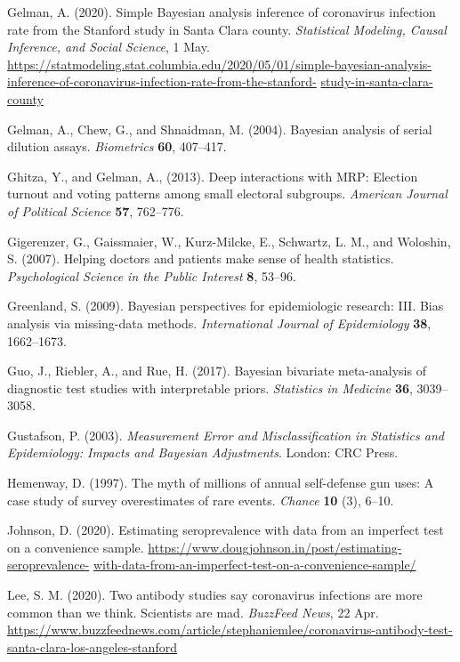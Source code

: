 \documentclass[11pt]{article}
\begin{document}
\bibitem Gelman, A. (2020).  Simple Bayesian analysis inference of
  coronavirus infection rate from the Stanford study in Santa Clara
  county. {\em Statistical Modeling, Causal Inference, and Social
    Science}, 1 May.  {\small \url{https://statmodeling.stat.columbia.edu/2020/05/01/simple-bayesian-analysis-inference-of-coronavirus-infection-rate-from-the-stanford-}} {\small \url{study-in-santa-clara-county}}
  
\bibitem Gelman, A., Chew, G., and Shnaidman, M. (2004).  Bayesian
  analysis of serial dilution assays. {\em Biometrics} {\bf 60},
  407--417.

\bibitem Ghitza, Y., and Gelman, A., (2013). Deep interactions with
  MRP: Election turnout and voting patterns among small electoral
  subgroups. {\em American Journal of Political Science} {\bf 57},
  762--776.

\bibitem Gigerenzer, G., Gaissmaier, W., Kurz-Milcke, E., Schwartz,
  L. M., and Woloshin, S.  (2007).  Helping doctors and patients make
  sense of health statistics.  {\em Psychological Science in the
    Public Interest} {\bf 8}, 53--96.

\bibitem Greenland, S. (2009).  Bayesian perspectives for
  epidemiologic research: III. Bias analysis via missing-data methods.
  {\em International Journal of Epidemiology} {\bf 38}, 1662--1673.

\bibitem Guo, J., Riebler, A., and Rue, H. (2017).  Bayesian bivariate
  meta-analysis of diagnostic test studies with interpretable priors.
  {\em Statistics in Medicine} {\bf 36}, 3039--3058.

\bibitem Gustafson, P. (2003).  {\em Measurement Error and
    Misclassification in Statistics and Epidemiology: Impacts and
    Bayesian Adjustments}.  London: CRC Press.

\bibitem Hemenway, D. (1997).  The myth of millions of annual
  self-defense gun uses: A case study of survey overestimates of rare
  events.  {\em Chance} {\bf 10} (3), 6--10.

\bibitem Johnson, D. (2020).  Estimating seroprevalence with data from
  an imperfect test on a convenience sample.  {\small
    \url{https://www.dougjohnson.in/post/estimating-seroprevalence-}} {\small \url{with-data-from-an-imperfect-test-on-a-convenience-sample/}}

\bibitem Lee, S. M. (2020).  Two antibody studies say coronavirus
  infections are more common than we think. Scientists are mad.  {\em
    BuzzFeed News}, 22 Apr.  {\small
    \url{https://www.buzzfeednews.com/article/stephaniemlee/coronavirus-antibody-test-santa-clara-los-angeles-stanford}}
\end{document}
